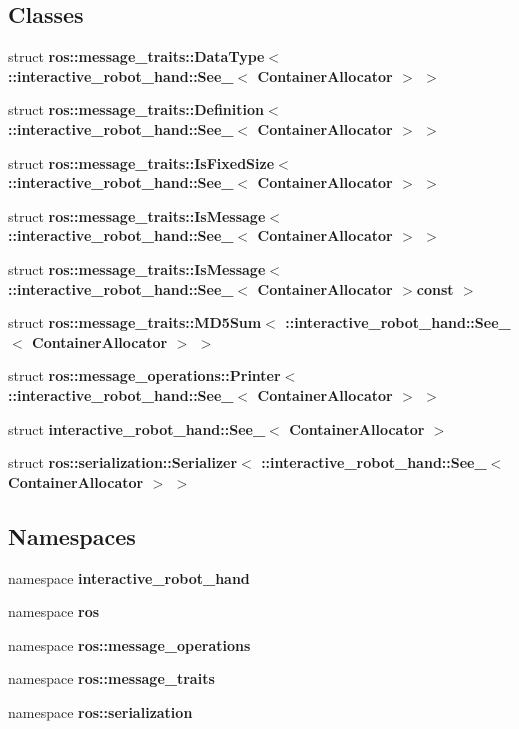 \subsection*{Classes}
\begin{DoxyCompactItemize}
\item 
struct {\bf ros\-::message\-\_\-traits\-::\-Data\-Type$<$ \-::interactive\-\_\-robot\-\_\-hand\-::\-See\-\_\-$<$ Container\-Allocator $>$ $>$}
\item 
struct {\bf ros\-::message\-\_\-traits\-::\-Definition$<$ \-::interactive\-\_\-robot\-\_\-hand\-::\-See\-\_\-$<$ Container\-Allocator $>$ $>$}
\item 
struct {\bf ros\-::message\-\_\-traits\-::\-Is\-Fixed\-Size$<$ \-::interactive\-\_\-robot\-\_\-hand\-::\-See\-\_\-$<$ Container\-Allocator $>$ $>$}
\item 
struct {\bf ros\-::message\-\_\-traits\-::\-Is\-Message$<$ \-::interactive\-\_\-robot\-\_\-hand\-::\-See\-\_\-$<$ Container\-Allocator $>$ $>$}
\item 
struct {\bf ros\-::message\-\_\-traits\-::\-Is\-Message$<$ \-::interactive\-\_\-robot\-\_\-hand\-::\-See\-\_\-$<$ Container\-Allocator $>$const  $>$}
\item 
struct {\bf ros\-::message\-\_\-traits\-::\-M\-D5\-Sum$<$ \-::interactive\-\_\-robot\-\_\-hand\-::\-See\-\_\-$<$ Container\-Allocator $>$ $>$}
\item 
struct {\bf ros\-::message\-\_\-operations\-::\-Printer$<$ \-::interactive\-\_\-robot\-\_\-hand\-::\-See\-\_\-$<$ Container\-Allocator $>$ $>$}
\item 
struct {\bf interactive\-\_\-robot\-\_\-hand\-::\-See\-\_\-$<$ Container\-Allocator $>$}
\item 
struct {\bf ros\-::serialization\-::\-Serializer$<$ \-::interactive\-\_\-robot\-\_\-hand\-::\-See\-\_\-$<$ Container\-Allocator $>$ $>$}
\end{DoxyCompactItemize}
\subsection*{Namespaces}
\begin{DoxyCompactItemize}
\item 
namespace {\bf interactive\-\_\-robot\-\_\-hand}
\item 
namespace {\bf ros}
\item 
namespace {\bf ros\-::message\-\_\-operations}
\item 
namespace {\bf ros\-::message\-\_\-traits}
\item 
namespace {\bf ros\-::serialization}
\end{DoxyCompactItemize}
